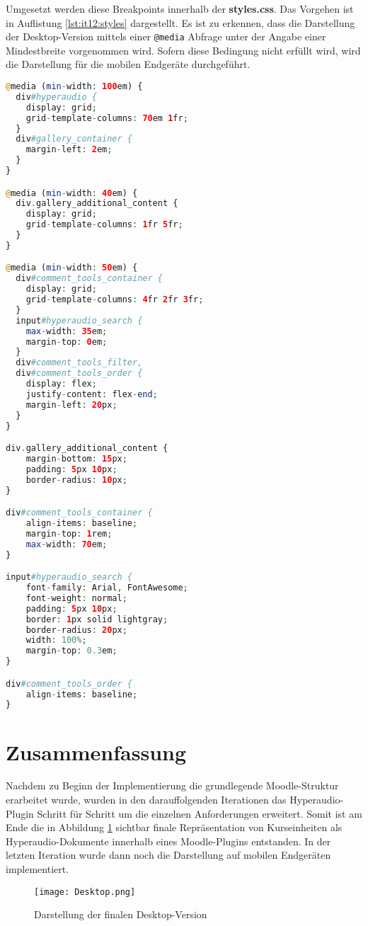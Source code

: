 Umgesetzt werden diese Breakpoints innerhalb der \textbf{styles.css}. Das Vorgehen ist in Auflistung \ref{lst:it12:styles} dargestellt. Es ist zu erkennen, dass die Darstellung der Desktop-Version mittels einer \texttt{@media} Abfrage unter der Angabe einer Mindestbreite vorgenommen wird. Sofern diese Bedingung nicht erfüllt wird, wird die Darstellung für die mobilen Endgeräte durchgeführt.

\begin{lstlisting}[language=php,
             linewidth=\textwidth,
             caption={Ausschnitt der \textbf{styles.css} in der 12. Iteration},
             label={lst:it12:styles}]
@media (min-width: 100em) {
  div#hyperaudio {
    display: grid;
    grid-template-columns: 70em 1fr;
  }
  div#gallery_container {
    margin-left: 2em;
  }
}

@media (min-width: 40em) {
  div.gallery_additional_content {
    display: grid;
    grid-template-columns: 1fr 5fr;
  }
}

@media (min-width: 50em) {
  div#comment_tools_container {
    display: grid;
    grid-template-columns: 4fr 2fr 3fr;
  }
  input#hyperaudio_search {
  	max-width: 35em;
  	margin-top: 0em;
  }
  div#comment_tools_filter,
  div#comment_tools_order {
  	display: flex;
    justify-content: flex-end;
    margin-left: 20px;
  }
}

div.gallery_additional_content {
    margin-bottom: 15px;
    padding: 5px 10px;
    border-radius: 10px;
}

div#comment_tools_container {
	align-items: baseline;
    margin-top: 1rem;
    max-width: 70em;
}

input#hyperaudio_search {
    font-family: Arial, FontAwesome;
    font-weight: normal;
    padding: 5px 10px;
    border: 1px solid lightgray;
    border-radius: 20px;
    width: 100%;
    margin-top: 0.3em;
}

div#comment_tools_order {
    align-items: baseline;
}
\end{lstlisting}


\section{Zusammenfassung}
Nachdem zu Beginn der Implementierung die grundlegende Moodle-Struktur erarbeitet wurde, wurden in den darauffolgenden Iterationen das Hyperaudio-Plugin Schritt für Schritt um die einzelnen Anforderungen erweitert. Somit ist am Ende die in Abbildung \ref{fig:DesktopFinal} sichtbar finale Repräsentation von Kurseinheiten als Hyperaudio-Dokumente innerhalb eines Moodle-Plugins entstanden. In der letzten Iteration wurde dann noch die Darstellung auf mobilen Endgeräten implementiert.
\begin{figure}[h!]
\texttt{[image: Desktop.png]}
\caption{\label{fig:DesktopFinal}Darstellung der finalen Desktop-Version}
\end{figure}